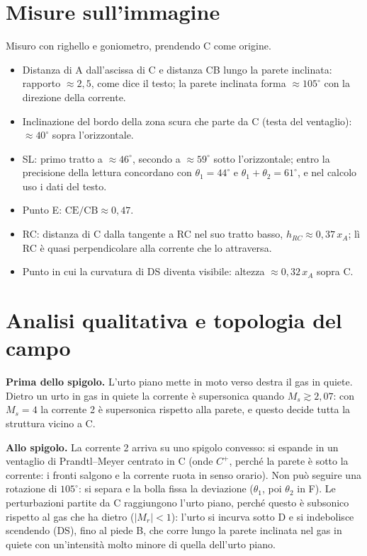 \documentclass[11pt,a4paper]{article}
\newcommand{\Cp}{C^{+}}
\begin{document}
\section{Misure sull'immagine}
Misuro con righello e goniometro, prendendo C come origine.
\begin{itemize}
  \item Distanza di A dall'ascissa di C e distanza CB lungo la parete inclinata: rapporto $\approx 2{,}5$, come dice il
  testo; la parete inclinata forma $\approx 105^\circ$ con la direzione della corrente.
  \item Inclinazione del bordo della zona scura che parte da C (testa del ventaglio): $\approx 40^\circ$ sopra
  l'orizzontale.
  \item SL: primo tratto a $\approx 46^\circ$, secondo a $\approx 59^\circ$ sotto l'orizzontale; entro la precisione
  della lettura concordano con $\theta_1=44^\circ$ e $\theta_1+\theta_2=61^\circ$, e nel calcolo uso i dati del testo.
  \item Punto E: $\mathrm{CE}/\mathrm{CB}\approx 0{,}47$.
  \item RC: distanza di C dalla tangente a RC nel suo tratto basso, $h_{RC}\approx 0{,}37\,x_A$; lì RC è quasi
  perpendicolare alla corrente che lo attraversa.
  \item Punto in cui la curvatura di DS diventa visibile: altezza $\approx 0{,}32\,x_A$ sopra C.
\end{itemize}

\section{Analisi qualitativa e topologia del campo}
\textbf{Prima dello spigolo.} L'urto piano mette in moto verso destra il gas in quiete. Dietro un urto in gas in
quiete la corrente è supersonica quando $M_s\gtrsim 2{,}07$: con $M_s=4$ la corrente 2 è supersonica rispetto alla
parete, e questo decide tutta la struttura vicino a C.

\textbf{Allo spigolo.} La corrente 2 arriva su uno spigolo convesso: si espande in un ventaglio di Prandtl--Meyer
centrato in C (onde $\Cp$, perché la parete è sotto la corrente: i fronti salgono e la corrente ruota in senso orario).
Non può seguire una rotazione di $105^\circ$: si separa e la bolla fissa la deviazione ($\theta_1$, poi $\theta_2$
in F). Le perturbazioni partite da C raggiungono l'urto piano, perché questo è subsonico rispetto al gas che ha dietro
($|M_r|<1$): l'urto si incurva sotto D e si indebolisce scendendo (DS), fino al piede B, che corre lungo la parete
inclinata nel gas in quiete con un'intensità molto minore di quella dell'urto piano.
\end{document}
